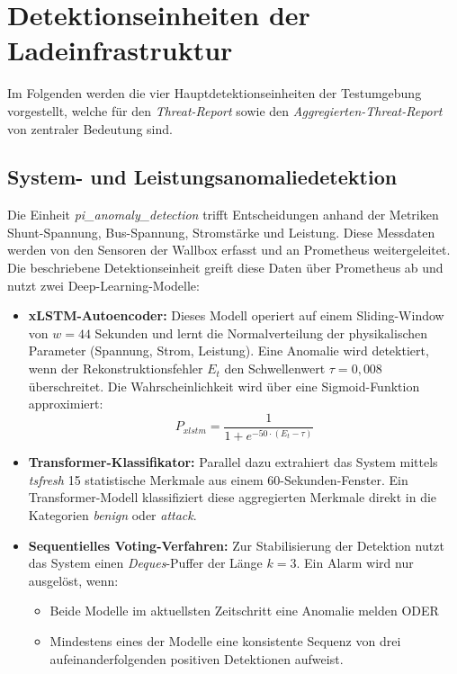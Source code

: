 \section{Detektionseinheiten der Ladeinfrastruktur}
\label{sec:detection_einheiten_der_ladeinfrastruktur}

Im Folgenden werden die vier Hauptdetektionseinheiten der Testumgebung vorgestellt, welche für den \textit{Threat-Report} sowie den \textit{Aggregierten-Threat-Report} von zentraler Bedeutung sind. 

    \subsection{System- und Leistungsanomaliedetektion}

    \label{subsec:System_und_Leistungsanomaliedetektion}
    Die Einheit \textit{pi\_anomaly\_detection} trifft Entscheidungen anhand der Metriken Shunt-Spannung, Bus-Spannung, Stromstärke und Leistung. Diese Messdaten werden von den Sensoren der Wallbox erfasst und an Prometheus weitergeleitet. Die beschriebene Detektionseinheit greift diese Daten über Prometheus ab und nutzt zwei Deep-Learning-Modelle:
    \begin{itemize}
        \item \textbf{xLSTM-Autoencoder:} Dieses Modell operiert auf einem Sliding-Window von $w=44$ Sekunden und lernt die Normalverteilung der physikalischen Parameter (Spannung, Strom, Leistung). Eine Anomalie wird detektiert, wenn der Rekonstruktionsfehler $E_t$ den Schwellenwert $\tau = 0,008$ überschreitet. Die Wahrscheinlichkeit wird über eine Sigmoid-Funktion approximiert:
        \[ P_{xlstm} = \frac{1}{1 + e^{-50 \cdot (E_t - \tau)}} \]
        \item \textbf{Transformer-Klassifikator:} Parallel dazu extrahiert das System mittels \textit{tsfresh} 15 statistische Merkmale aus einem 60-Sekunden-Fenster. Ein Transformer-Modell klassifiziert diese aggregierten Merkmale direkt in die Kategorien \textit{benign} oder \textit{attack}.
        \item \textbf{Sequentielles Voting-Verfahren:} Zur Stabilisierung der Detektion nutzt das System einen \textit{Deques}-Puffer der Länge $k=3$. Ein Alarm wird nur ausgelöst, wenn:
        \begin{itemize}
            \item Beide Modelle im aktuellsten Zeitschritt eine Anomalie melden ODER
            \item Mindestens eines der Modelle eine konsistente Sequenz von drei aufeinanderfolgenden positiven Detektionen aufweist.
        \end{itemize}
    \end{itemize}
    
